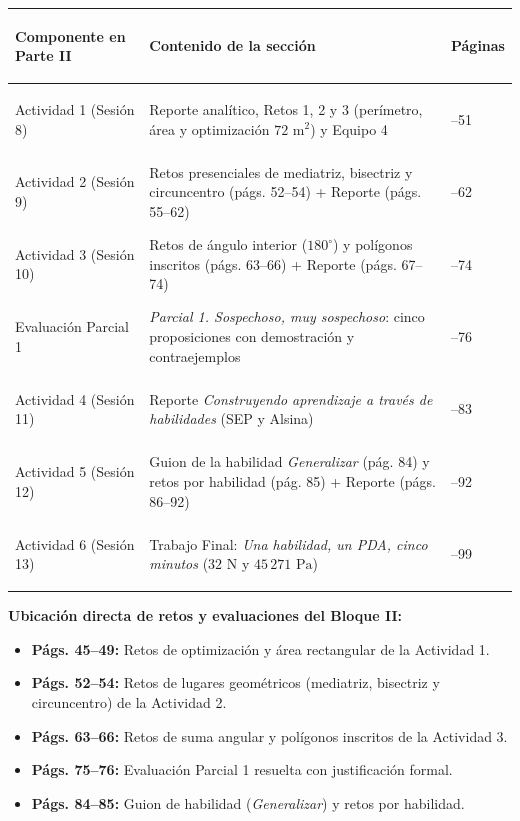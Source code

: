\documentclass[spanish,letterpaper,oneside]{article}
\begin{document}
\vspace{0.35cm}
{\footnotesize{}\renewcommand{\arraystretch}{1.15}
\noindent\begin{tabularx}{\textwidth}{|>{\bfseries\raggedright\arraybackslash}p{}|>{\raggedright\arraybackslash}X|>{\centering\arraybackslash}p{}|}
\hline
\rowcolor{iiiepeNavy}
\color{white}\textbf{Componente en Parte II} &
\color{white}\textbf{Contenido de la sección} &
\color{white}\textbf{Páginas} \\\hline
\rowcolor{iiiepePale}
Actividad 1 (Sesión 8) & Reporte analítico, Retos 1, 2 y 3 (perímetro, área y optimización $72\text{ m}^2$) y Equipo 4 & 44--51 \\\hline
Actividad 2 (Sesión 9) & Retos presenciales de mediatriz, bisectriz y circuncentro (págs. 52--54) + Reporte (págs. 55--62) & 52--62 \\\hline
\rowcolor{iiiepePale}
Actividad 3 (Sesión 10) & Retos de ángulo interior ($180^\circ$) y polígonos inscritos (págs. 63--66) + Reporte (págs. 67--74) & 63--74 \\\hline
Evaluación Parcial 1 & \textit{Parcial 1. Sospechoso, muy sospechoso}: cinco proposiciones con demostración y contraejemplos & 75--76 \\\hline
\rowcolor{iiiepePale}
Actividad 4 (Sesión 11) & Reporte \textit{Construyendo aprendizaje a través de habilidades} (SEP y Alsina) & 77--83 \\\hline
Actividad 5 (Sesión 12) & Guion de la habilidad \textit{Generalizar} (pág. 84) y retos por habilidad (pág. 85) + Reporte (págs. 86--92) & 84--92 \\\hline
\rowcolor{iiiepePale}
Actividad 6 (Sesión 13) & Trabajo Final: \textit{Una habilidad, un PDA, cinco minutos} ($32\text{ N}$ y $45\,271\text{ Pa}$) & 93--99 \\\hline
\end{tabularx}
}

\vspace{0.32cm}
\noindent\colorbox{iiiepePale}{%
  \parbox{\dimexpr\textwidth-2\fboxsep\relax}{%
    \footnotesize\textbf{Ubicación directa de retos y evaluaciones del Bloque II:}
    \begin{itemize}\setlength{\itemsep}{1pt}\setlength{\topsep}{2pt}
      \item \textbf{Págs. 45--49:} Retos de optimización y área rectangular de la Actividad 1.
      \item \textbf{Págs. 52--54:} Retos de lugares geométricos (mediatriz, bisectriz y circuncentro) de la Actividad 2.
      \item \textbf{Págs. 63--66:} Retos de suma angular y polígonos inscritos de la Actividad 3.
      \item \textbf{Págs. 75--76:} Evaluación Parcial 1 resuelta con justificación formal.
      \item \textbf{Págs. 84--85:} Guion de habilidad (\textit{Generalizar}) y retos por habilidad.
    \end{itemize}
  }%
}
\end{document}
